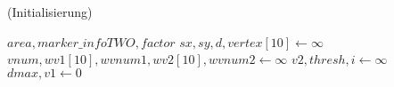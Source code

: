 \begin{algorithm}[!ht]
\caption{ (Initialisierung)}
\label{alg:checksquare-1}
\begin{algorithmic}[1]
	\Require $\mathit{area}, \mathit{marker\_infoTWO}, \mathit{factor}$
	\State $\mathit{sx}, \mathit{sy}, d, \mathit{vertex}[10] \gets \infty$
	\State $\mathit{vnum}, \mathit{wv1}[10], \mathit{wvnum1}, \mathit{wv2}[10], \mathit{wvnum2} \gets \infty$
	\State $\mathit{v2}, \mathit{thresh}, i \gets \infty$
	\State $\mathit{dmax},\mathit{v1} \gets 0$
\end{algorithmic}
\end{algorithm}
